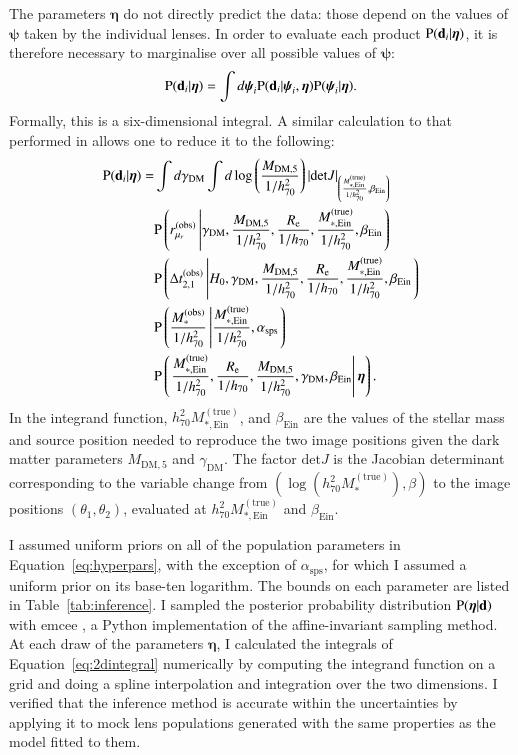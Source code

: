 \documentclass{aa}
\def\hseventy{h_{70}}
\def\dtobs{\Delta t_{2,1}^{(\mathrm{obs})}}
\def\mobs{M_*^{\mathrm{(obs)}}}
\def\mstartrue{M_*^{\mathrm{(true)}}}
\def\mstartrueein{M_{*,\mathrm{Ein}}^{\mathrm{(true)}}}
\def\detJ{\mathrm{det}J}
\def\mfive{M_{\mathrm{DM},5}}
\def\rmurobs{r_{\mu_r}^{(\mathrm{obs})}}
\def\gammadm{\gamma_{\mathrm{DM}}}
\def\asps{\alpha_{\mathrm{sps}}}
\def\betaein{\beta_{\mathrm{Ein}}}
\def\reff{R_{\mathrm{e}}}
\def\hyperpars{\boldsymbol{\eta}}
\def\indpar{\boldsymbol{\psi}}
\def\indpari{\boldsymbol{\psi}_i}
\def\data{\mathbf{d}}
\def\datai{\mathbf{d}_i}
\def\Tref#1{Table~\ref{#1}\xspace}
\def\Eref#1{Equation~\ref{#1}\xspace}
\def\pr{{\rm P}}
\begin{document}
The parameters $\hyperpars$ do not directly predict the data: those depend on the values of $\indpar$ taken by the individual lenses. In order to evaluate each product $\pr(\datai|\hyperpars)$, it is therefore necessary to marginalise over all possible values of $\indpar$:
\begin{equation}\label{eq:fullintegral}
\pr(\datai|\hyperpars) = \int d\indpari \pr(\datai|\indpari,\hyperpars) \pr(\indpari|\hyperpars).
\end{equation}
Formally, this is a six-dimensional integral. A similar calculation to that performed in  allows one to reduce it to the following:
\begin{equation}\label{eq:2dintegral}
\begin{split}
\pr(\datai|\hyperpars) = & \int d\gammadm \int d\log{\left(\frac{\mfive}{1/\hseventy^2}\right)} \left\lvert\detJ\right\rvert_{\left(\frac{\mstartrueein}{1/\hseventy^2},\betaein\right)}\\
& \pr\left(\rmurobs \left\vert\gammadm,\frac{\mfive}{1/\hseventy^2},\frac{\reff}{1/\hseventy},\frac{\mstartrueein}{1/\hseventy^2},\betaein\right.\right) \\
& \pr\left(\dtobs\left\vert H_0,\gammadm,\frac{\mfive}{1/\hseventy^2},\frac{\reff}{1/\hseventy},\frac{\mstartrueein}{1/\hseventy^2},\betaein\right. \right) \\
& \pr\left(\frac{\mobs}{1/\hseventy^2}\left\vert \frac{\mstartrueein}{1/\hseventy^2},\asps\right. \right) \\
& \pr\left(\left.\frac{\mstartrueein}{1/\hseventy^2},\frac{\reff}{1/\hseventy},\frac{\mfive}{1/\hseventy^2},\gammadm,\betaein\right\vert \hyperpars\right).
\end{split}
\end{equation}
In the integrand function, $\hseventy^2\mstartrueein$, and $\betaein$ are the values of the stellar mass and source position needed to reproduce the two image positions given the dark matter parameters $\mfive$ and $\gammadm$. The factor $\detJ$ is the Jacobian determinant corresponding to the variable change from $(\log{(\hseventy^2\mstartrue)},\beta)$ to the image positions $(\theta_1,\theta_2)$, evaluated at $\hseventy^2\mstartrueein$ and $\betaein$.

I assumed uniform priors on all of the population parameters in \Eref{eq:hyperpars}, with the exception of $\asps$, for which I assumed a uniform prior on its base-ten logarithm.
The bounds on each parameter are listed in \Tref{tab:inference}.
I sampled the posterior probability distribution $\pr(\hyperpars|\data)$ with {\sc emcee} \citep{For++13}, a Python implementation of the \citet{G+W10} affine-invariant sampling method.
At each draw of the parameters $\hyperpars$, I calculated the integrals of \Eref{eq:2dintegral} numerically by computing the integrand function on a grid and doing a spline interpolation and integration over the two dimensions.
I verified that the inference method is accurate within the uncertainties by applying it to mock lens populations generated with the same properties as the model fitted to them.
\end{document}
